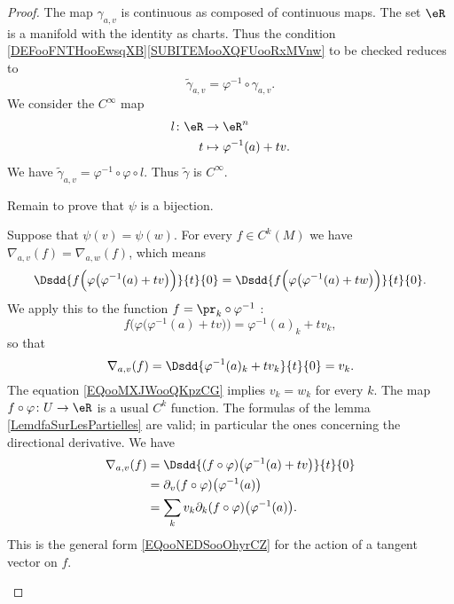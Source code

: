 \begin{proof}
	The map \( \gamma_{a,v}\) is continuous as composed of continuous maps. The set \( \eR\) is a manifold with the identity as charts. Thus the condition \ref{DEFooFNTHooEwsqXB}\ref{SUBITEMooXQFUooRxMVnw} to be checked reduces to
	\begin{equation}
		\tilde \gamma_{a,v}=\varphi^{-1}\circ\gamma_{a,v}.
	\end{equation}
	We consider the \(  C^{\infty}\) map
	\begin{equation}
		\begin{aligned}
			l\colon \eR & \to \eR^n                   \\
			t           & \mapsto \varphi^{-1}(a)+tv.
		\end{aligned}
	\end{equation}
	We have \( \tilde \gamma_{a,v}=\varphi^{-1}\circ\varphi \circ l\). Thus \( \tilde \gamma\) is \(  C^{\infty}\).

	Remain to prove that \( \psi\) is a bijection.
	\begin{subproof}
		\spitem[Injective]
		Suppose that \( \psi(v)=\psi(w)\). For every \( f\in C^k(M)\) we have \( \nabla_{a,v}(f)=\nabla_{a,w}(f)\), which means
		\begin{equation}        \label{EQooMXJWooQKpzCG}
			\Dsdd{ f\Big( \varphi\big( \varphi^{-1}(a)+tv \big) \Big) }{t}{0}=\Dsdd{ f\Big( \varphi\big( \varphi^{-1}(a)+tw \big) \Big) }{t}{0}.
		\end{equation}
		We apply this to the function \( f=\pr_k\circ\varphi^{-1}\) :
		\begin{equation}
			f\Big( \varphi\big( \varphi^{-1}(a)+tv \big) \Big)=\varphi^{-1}(a)_k+tv_k,
		\end{equation}
		so that
		\begin{equation}
			\nabla_{a,v}(f)=\Dsdd{ \varphi^{-1}(a)_k+tv_k }{t}{0}=v_k.
		\end{equation}
		The equation \eqref{EQooMXJWooQKpzCG} implies \( v_k=w_k\) for every \( k\).
		\spitem[Surjective]
		The map \( f\circ \varphi\colon U \to \eR \) is a usual \( C^k\) function. The formulas of the lemma \ref{LemdfaSurLesPartielles} are valid; in particular the ones concerning the directional derivative. We have
		\begin{subequations}
			\begin{align}
				\nabla_{a,v}(f) & =\Dsdd{ (f\circ \varphi)\big( \varphi^{-1}(a)+tv \big) }{t}{0}   \\
				                & =\partial_v(f\circ \varphi)\big( \varphi^{-1}(a) \big)           \\
				                & =\sum_k v_k\partial_k(f\circ\varphi)\big( \varphi^{-1}(a) \big).
			\end{align}
		\end{subequations}
		This is the general form \eqref{EQooNEDSooOhyrCZ} for the action of a tangent vector on \( f\).
	\end{subproof}
\end{proof}


